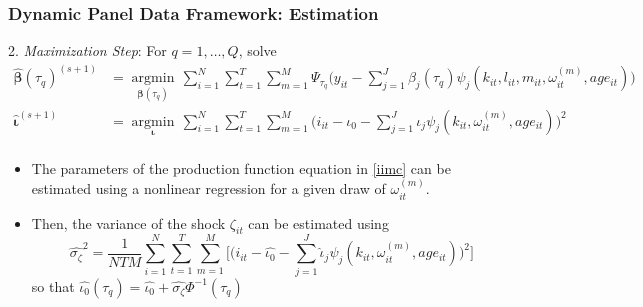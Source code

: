 \documentclass{beamer}
\begin{document}
\begin{frame}
\frametitle{Dynamic Panel Data Framework: Estimation}
2. \textit{Maximization Step}: For $q=1,\dots, Q$, solve
\small
    \begin{equation*}
    \begin{split}
    \hat{\boldsymbol\beta}(\tau_{q})^{(s+1)}&=\underset{\boldsymbol\beta(\tau_{q})}{\operatorname{argmin}}\,\sum_{i=1}^{N}\sum_{t=1}^{T}\sum_{m=1}^{M}\Psi_{\tau_{q}}\bigg(y_{it}-\sum_{j=1}^{J}\beta_{j}(\tau_{q})\psi_{j}(k_{it}, l_{it}, m_{it}, \omega_{it}^{(m)}, age_{it})\bigg)\\
    \hat{\boldsymbol\iota}^{(s+1)}&=\underset{\boldsymbol\iota}{\operatorname{argmin}}\,\sum_{i=1}^{N}\sum_{t=1}^{T}\sum_{m=1}^{M}\bigg(i_{it}-\iota_{0}-\sum_{j=1}^{J}\iota_{j}\psi_{j}(k_{it}, \omega_{it}^{(m)}, age_{it})\bigg)^{2}\\
    \end{split}
    \end{equation*}
\begin{itemize}
	\item The parameters of the production function equation in \eqref{iimc} can be estimated using a nonlinear regression for a given draw of $\omega_{it}^{(m)}$. 
	\item Then, the variance of the shock $\zeta_{it}$ can be estimated using
	\begin{equation}\label{staticivar}
     \hat{\sigma_{\zeta}}^{2}=\frac{1}{NTM}\sum_{i=1}^{N}\sum_{t=1}^{T}\sum_{m=1}^{M}\Bigg[\Bigg(i_{it}-\hat{\iota_{0}}-\sum_{j=1}^{J}\hat{\iota}_{j}\psi_{j}(k_{it}, \omega_{it}^{(m)}, age_{it})\Bigg)^{2}\Bigg]
     \end{equation}
     so that $\hat{\iota_{0}}(\tau_{q})=\hat{\iota_{0}}+\hat{\sigma_{\zeta}}\Phi^{-1}(\tau_{q})$
\end{itemize}

\end{frame}

\end{document}
